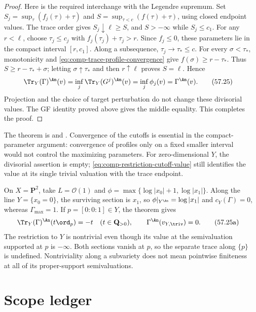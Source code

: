 \begin{proof}
Here is the required interchange with the Legendre supremum.
Set $S_j=\sup_\tau(f_j(\tau)+\tau)$ and
$S=\sup_{\tau<c}(f(\tau)+\tau)$, using closed endpoint values.
The trace order gives $S_j\downarrow\ell\geq S$, and
$S> -\infty$ while $S_j\leq c_1$.
For any $r<\ell$, choose $\tau_j\leq c_j$ with
$f_j(\tau_j)+\tau_j>r$.
Since $f_j\leq0$, these parameters lie in the compact interval
$[r,c_1]$. Along a subsequence, $\tau_j\to\tau_*\leq c$.
For every $\sigma<\tau_*$, monotonicity and
\eqref{eq:comp-trace-profile-convergence} give
$f(\sigma)\geq r-\tau_*$.
Thus $S\geq r-\tau_*+\sigma$; letting $\sigma\uparrow\tau_*$
and then $r\uparrow\ell$ proves $S=\ell$.
Hence
\[
 \Tr_Y(\Gamma)^{\An}(v)
       =\inf_j\Tr_Y(G^j)^{\An}(v)
       =\inf_j\phi_j(v)=\Gamma^{\An}(v).
\tag{57.25}\label{eq:comp-trace-limit}
\]
Projection and the choice of target perturbation do not change these
divisorial values. The GF identity proved above gives the middle
equality. This completes the proof.
\end{proof}

The theorem is \cite[Theorem~4.21, Section~4.7]{XiaOperationsV3}
and \cite[Theorem~13.4.5]{XiaBook}.
Convergence of the cutoffs is essential in the compact-parameter
argument: convergence of profiles only on a fixed smaller interval
would not control the maximizing parameters.
For zero-dimensional $Y$, the divisorial assertion is empty;
\eqref{eq:comp-restriction-cutoff-value} still identifies the value
at its single trivial valuation with the trace endpoint.

\begin{example}
\label{ex:comp-trace-polar-subset}
On $X=\mathbf P^2$, take $L=\mathcal O(1)$ and
$\phi=\max\{\log|x_0|+1,\log|x_1|\}$.
Along the line $Y=\{x_0=0\}$, the surviving section is $x_1$,
so $\phi|_{Y^{\An}}=\log|x_1|$ and $c_Y(\Gamma)=0$,
whereas $\Gamma_{\max}=1$.
If $p=[0:0:1]\in Y$, the theorem gives
\[
 \Tr_Y(\Gamma)^{\An}(t\ord_p)=-t\quad(t\in\mathbf Q_{>0}),
 \qquad \Gamma^{\An}(v_{Y,\triv})=0.
\tag{57.25a}\label{eq:comp-trace-line-example}
\]
The restriction to $Y$ is nontrivial even though its value at the
semivaluation supported at $p$ is $-\infty$.
Both sections vanish at $p$, so the separate trace along $\{p\}$
is undefined. Nontriviality along a subvariety does not mean
pointwise finiteness at all of its proper-support semivaluations.
\end{example}
\section{Scope ledger}
\label{sec:comp-scope}

